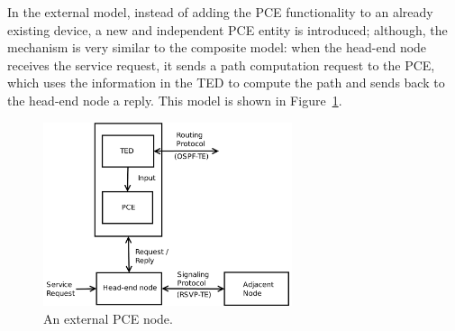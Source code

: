 \documentclass[10pt,a4paper]{report}
\begin{document}
In the external model, instead of adding the PCE functionality to an
already existing device, a new and independent PCE entity is
introduced; although, the mechanism is very similar to the composite
model: when the head-end node receives the service request, it sends a
path computation request to the PCE, which uses the information in the
TED to compute the path and sends back to the head-end node a
reply. This model is shown in Figure~\ref{fig:pce_external}.

\begin{figure}[!htbp]
  \centering
  \includegraphics[width=0.65\textwidth]{img/pce_external}
  \caption[External PCE model]{An external PCE node.}
  \label{fig:pce_external}
\end{figure}
\end{document}

